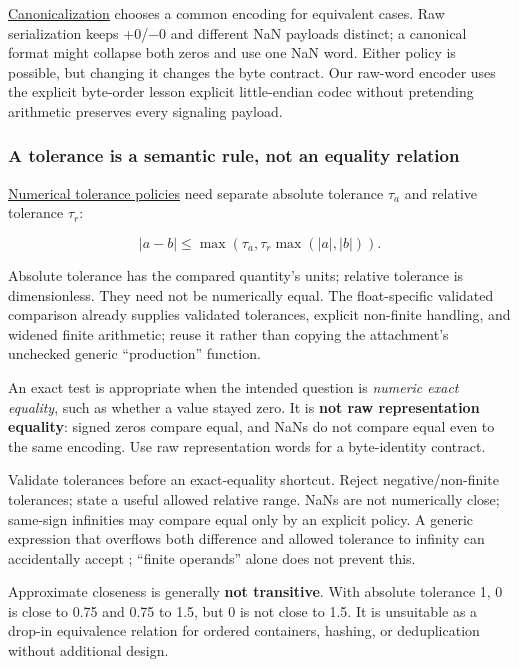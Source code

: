 \hyperref[appendix-e90053a4b201]{Canonicalization} chooses a common encoding for equivalent cases. Raw serialization keeps +0/−0 and different NaN payloads distinct; a canonical format might collapse both zeros and use one NaN word. Either policy is possible, but changing it changes the byte contract. Our raw-word encoder uses the explicit byte-order lesson explicit little-endian codec without pretending arithmetic preserves every signaling payload.

\subsubsection{A tolerance is a semantic rule, not an equality relation}\label{01-foundations-i-ch001-a-tolerance-is-a-semantic-rule-not-an-equality-relation}

\hypertarget{01-foundations-i-ch001-a-tolerance-is-a-semantic-rule-not-an-equality-relation}{}

\hyperref[appendix-0ec599f8ba27]{Numerical tolerance policies} need separate absolute tolerance \(\tau_a\) and relative tolerance \(\tau_r\):

\[
|a-b|\le\max\!\left(\tau_a,\tau_r\max(|a|,|b|)\right).
\]

Absolute tolerance has the compared quantity's units; relative tolerance is dimensionless. They need not be numerically equal. The float-specific validated comparison already supplies validated tolerances, explicit non-finite handling, and widened finite arithmetic; reuse it rather than copying the attachment's unchecked generic ``production'' function.

An exact \BookInlineCode{{=}{=}}{==} test is appropriate when the intended question is \emph{numeric exact equality}, such as whether a value stayed zero. It is \textbf{not raw representation equality}: signed zeros compare equal, and NaNs do not compare equal even to the same encoding. Use raw representation words for a byte-identity contract.

Validate tolerances before an exact-equality shortcut. Reject negative/non-finite tolerances; state a useful allowed relative range. NaNs are not numerically close; same-sign infinities may compare equal only by an explicit policy. A generic expression that overflows both difference and allowed tolerance to infinity can accidentally accept ; ``finite operands'' alone does not prevent this.

Approximate closeness is generally \textbf{not transitive}. With absolute tolerance 1, 0 is close to 0.75 and 0.75 to 1.5, but 0 is not close to 1.5. It is unsuitable as a drop-in equivalence relation for ordered containers, hashing, or deduplication without additional design.

